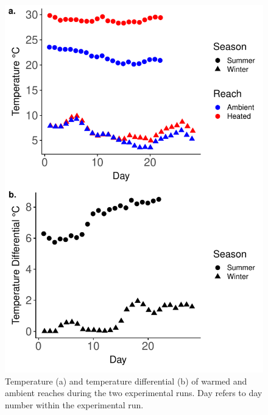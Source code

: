\begin{figure}%
    \centering
    \includegraphics[scale=0.9]{figures/ch5/shannontemp.pdf}
  \caption [Temperature of the experimental sites in the River Shannon]{Temperature (a) and temperature differential (b) of warmed and ambient reaches during the two experimental runs. Day refers to day number within the experimental run.} 
    \label{fig:shannontemp}
\end{figure}

